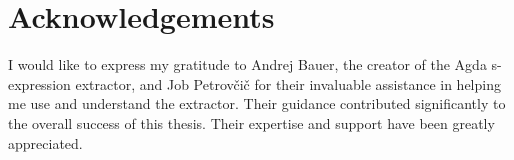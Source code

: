 
\chapter*{Acknowledgements}

I would like to express my gratitude to Andrej Bauer, the creator of the Agda
s-expression extractor, and Job Petrovčič for their invaluable assistance in
helping me use and understand the extractor. Their guidance contributed
significantly to the overall success of this thesis. Their expertise and
support have been greatly appreciated.
